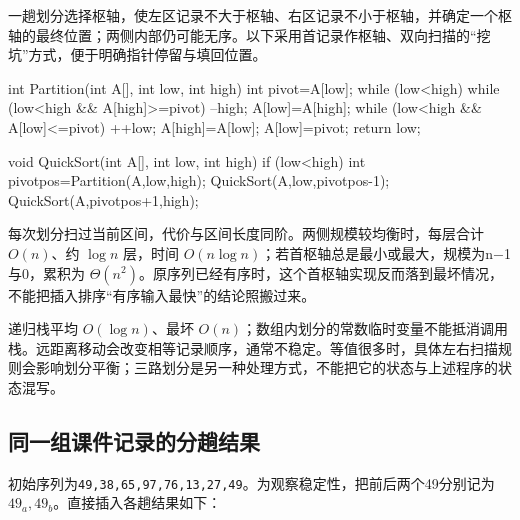 一趟划分选择枢轴，使左区记录不大于枢轴、右区记录不小于枢轴，并确定一个枢轴的最终位置；两侧内部仍可能无序。以下采用首记录作枢轴、双向扫描的``挖坑''方式，便于明确指针停留与填回位置。

\par\medskip\noindent\begin{minipage}{\linewidth}
\begin{codeblock}[language=C++]
int Partition(int A[], int low, int high) {
    int pivot=A[low];
    while (low<high) {
        while (low<high && A[high]>=pivot) --high;
        A[low]=A[high];
        while (low<high && A[low]<=pivot) ++low;
        A[high]=A[low];
    }
    A[low]=pivot;
    return low;
}
\end{codeblock}
\end{minipage}\par\medskip

\par\medskip\noindent\begin{minipage}{\linewidth}
\begin{codeblock}[language=C++]
void QuickSort(int A[], int low, int high) {
    if (low<high) {
        int pivotpos=Partition(A,low,high);
        QuickSort(A,low,pivotpos-1);
        QuickSort(A,pivotpos+1,high);
    }
}
\end{codeblock}
\end{minipage}\par\medskip

每次划分扫过当前区间，代价与区间长度同阶。两侧规模较均衡时，每层合计 \(O(n)\)、约 \(\log n\) 层，时间 \(O(n\log n)\)；若首枢轴总是最小或最大，规模为n\ensuremath{-}1与0，累积为 \(\Theta(n^2)\)。原序列已经有序时，这个首枢轴实现反而落到最坏情况，不能把插入排序``有序输入最快''的结论照搬过来。

递归栈平均 \(O(\log n)\)、最坏 \(O(n)\)；数组内划分的常数临时变量不能抵消调用栈。远距离移动会改变相等记录顺序，通常不稳定。等值很多时，具体左右扫描规则会影响划分平衡；三路划分是另一种处理方式，不能把它的状态与上述程序的状态混写。

\subsection{同一组课件记录的分趟结果}\label{DS08-course-traces}

初始序列为\texttt{49,\allowbreak{}38,\allowbreak{}65,\allowbreak{}97,\allowbreak{}76,\allowbreak{}13,\allowbreak{}27,\allowbreak{}49}。为观察稳定性，把前后两个49分别记为\(49_a,49_b\)。直接插入各趟结果如下：

